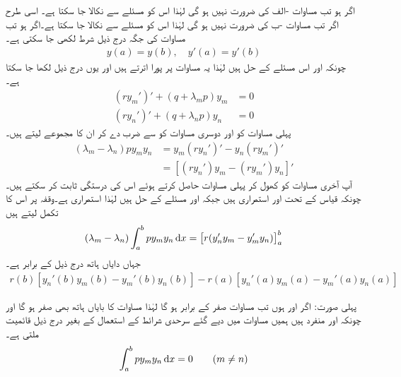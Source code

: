 اگر  ہو تب مساوات -الف کی ضرورت نہیں ہو گی لہٰذا اس کو مسئلے سے نکالا جا سکتا ہے۔ اسی طرح اگر  تب مساوات -ب کی ضرورت نہیں ہو گی لہٰذا اس کو مسئلے سے نکالا جا سکتا ہے۔اگر  ہو تب مساوات  کی جگہ درج ذیل شرط لکھی جا سکتی ہے۔
\begin{align}\label{مساوات_طاقتی_تسلسل_ثبوت_عمودیت_الف}
y(a)=y(b),\quad y'(a)=y'(b)
\end{align}
چونکہ  اور  اس مسئلے کے حل ہیں لہٰذا یہ مساوات  پر پورا اترتے ہیں اور یوں درج ذیل لکھا جا سکتا ہے۔
\begin{align*}
(ry_m')'+(q+\lambda_m p)y_m&=0\\
(ry_n')'+(q+\lambda_n p)y_n&=0
\end{align*}
پہلی مساوات کو  اور دوسری مساوات کو  سے ضرب دے کر ان کا مجموعے لیتے ہیں۔
\begin{align*}
(\lambda_m-\lambda_n)p y_my_n&=y_m(ry_n')'-y_n(ry_m')'\\
&=[(ry_n')y_m-(ry_m')y_n]'
\end{align*}
آپ آخری مساوات  کو کھول کر پہلی مساوات حاصل کرتے ہوئے اس کی درستگی ثابت کر سکتے ہیں۔چونکہ قیاس کے تحت  اور  استمراری ہیں جبکہ  اور  مسئلے کے حل ہیں لہٰذا  استمراری ہے۔وقفہ  پر اس کا تکمل لیتے ہیں
\begin{align}\label{مساوات_طاقتی_تسلسل_ثبوت_عمودیت_ب}
(\lambda_m-\lambda_n)\int_a^b py_my_n\dif x=\left[r(y_n'y_m-y_m'y_n)\right]_a^b
\end{align}
جہاں دایاں ہاتھ درج ذیل کے برابر ہے۔
\begin{align}\label{مساوات_طاقتی_تسلسل_ثبوت_عمودیت_پ}
r(b)[y_n'(b)y_m(b)-y_m'(b)y_n(b)]-r(a)[y_n'(a)y_m(a)-y_m'(a)y_n(a)]
\end{align}

پہلی صورت: اگر  اور  ہوں تب  مساوات  صفر کے برابر ہو گا لہٰذا مساوات  کا بایاں ہاتھ بھی صفر ہو گا اور چونکہ  اور  منفرد ہیں ہمیں مساوات  میں دیے گئے سرحدی شرائط کے استعمال کے بغیر درج ذیل قائمیت ملتی ہے۔
\begin{align}\label{مساوات_طاقتی_تسلسل_ثبوت_عمودیت_ت}
\int_a^b py_my_n\dif x=0\quad \quad (m\ne n)
\end{align} 

